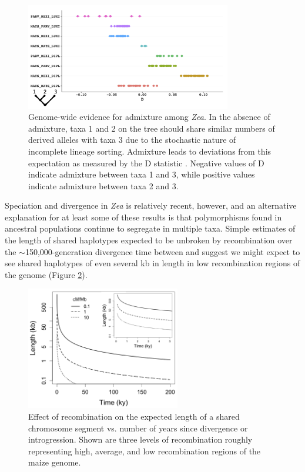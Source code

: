 \begin{figure}
  \centering
   \includegraphics[width=0.8\textwidth]{abbas}
    \caption{Genome-wide evidence for admixture among \emph{Zea}. In the absence of admixture, taxa 1 and 2 on the tree should share similar numbers of derived alleles with taxa 3 due to the stochastic nature of incomplete lineage sorting.  Admixture leads to deviations from this expectation as measured by the D statistic \citep{green2010draft}. Negative values of D indicate admixture between taxa 1 and 3, while positive values indicate admixture between taxa 2 and 3.} 
\label{fig:abba}
\end{figure}

Speciation and divergence in \emph{Zea} is relatively recent, however, and an alternative explanation for at least some of these results is that polymorphisms found in ancestral populations continue to segregate in multiple taxa. 		
Simple estimates of the length of shared haplotypes expected to be unbroken by recombination over the $\sim$150,000-generation divergence time between \zm{} and \zl{} \citep{Ross-Ibarra2009a} suggest we might expect to see shared haplotypes of even several kb in length in low recombination regions of the genome (Figure \ref{fig:length}).

\begin{figure}
  \centering
   \includegraphics[width=0.6\textwidth]{length_vs_time2}
    \caption{Effect of recombination on the expected length of a shared chromosome segment vs. number of years since divergence or introgression.  Shown are three levels of recombination roughly representing high, average, and low recombination regions of the maize genome.}
\label{fig:length}
\end{figure}

